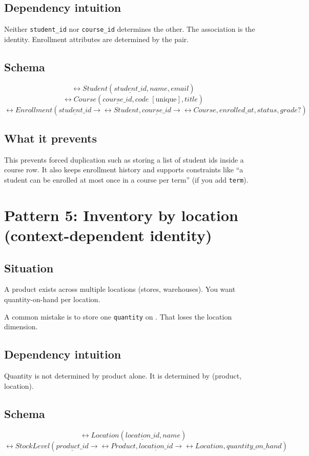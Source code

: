\subsection{Dependency intuition}
Neither \texttt{student\_id} nor \texttt{course\_id} determines the other.
The association is the identity.
Enrollment attributes are determined by the pair.

\subsection{Schema}
\[
\rel{Student}(\underline{student\_id}, name, email)
\]
\[
\rel{Course}(\underline{course\_id}, code \;[\text{unique}], title)
\]
\[
\rel{Enrollment}(\underline{student\_id} \rightarrow \rel{Student}, \underline{course\_id} \rightarrow \rel{Course}, enrolled\_at, status, grade?)
\]

\subsection{What it prevents}
This prevents forced duplication such as storing a list of student ids inside a course row.
It also keeps enrollment history and supports constraints like “a student can be enrolled at most once in a course per term” (if you add \texttt{term}).

\section{Pattern 5: Inventory by location (context-dependent identity)}
\subsection{Situation}
A product exists across multiple locations (stores, warehouses).
You want quantity-on-hand per location.

A common mistake is to store one \texttt{quantity} on .
That loses the location dimension.

\subsection{Dependency intuition}
Quantity is not determined by product alone.
It is determined by (product, location).

\subsection{Schema}
\[
\rel{Location}(\underline{location\_id}, name)
\]
\[
\rel{StockLevel}(\underline{product\_id} \rightarrow \rel{Product}, \underline{location\_id} \rightarrow \rel{Location}, quantity\_on\_hand)
\]

